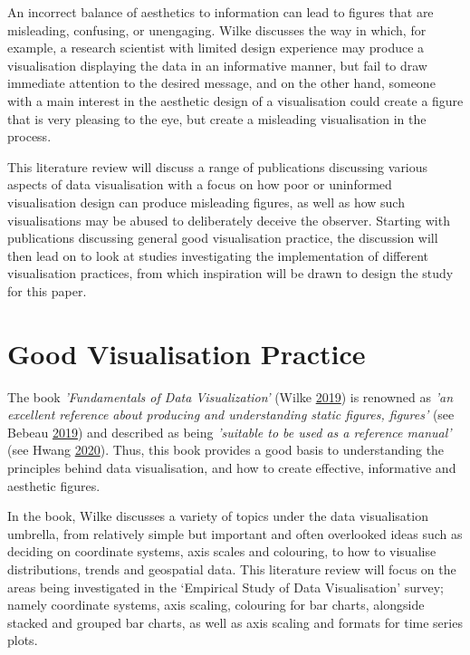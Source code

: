 \documentclass[
  11pt,
]{book}
\begin{document}
An incorrect balance of aesthetics to information can lead to figures
that are misleading, confusing, or unengaging. Wilke discusses the way
in which, for example, a research scientist with limited design
experience may produce a visualisation displaying the data in an
informative manner, but fail to draw immediate attention to the desired
message, and on the other hand, someone with a main interest in the
aesthetic design of a visualisation could create a figure that is very
pleasing to the eye, but create a misleading visualisation in the
process.

This literature review will discuss a range of publications discussing
various aspects of data visualisation with a focus on how poor or
uninformed visualisation design can produce misleading figures, as well
as how such visualisations may be abused to deliberately deceive the
observer. Starting with publications discussing general good
visualisation practice, the discussion will then lead on to look at
studies investigating the implementation of different visualisation
practices, from which inspiration will be drawn to design the study for
this paper.

\section{Good Visualisation Practice}

The book \textit{'Fundamentals of Data Visualization'} (Wilke
\protect\hyperlink{ref-wilke2019}{2019}) is renowned as
\textit{'an excellent reference about producing and understanding static figures, figures'}
(see Bebeau \protect\hyperlink{ref-wilkerev}{2019}) and described as
being \textit{'suitable to be used as a reference manual'} (see Hwang
\protect\hyperlink{ref-hwang2020}{2020}). Thus, this book provides a
good basis to understanding the principles behind data visualisation,
and how to create effective, informative and aesthetic figures.

In the book, Wilke discusses a variety of topics under the data
visualisation umbrella, from relatively simple but important and often
overlooked ideas such as deciding on coordinate systems, axis scales and
colouring, to how to visualise distributions, trends and geospatial
data. This literature review will focus on the areas being investigated
in the `Empirical Study of Data Visualisation' survey; namely coordinate
systems, axis scaling, colouring for bar charts, alongside stacked and
grouped bar charts, as well as axis scaling and formats for time series
plots.
\end{document}
